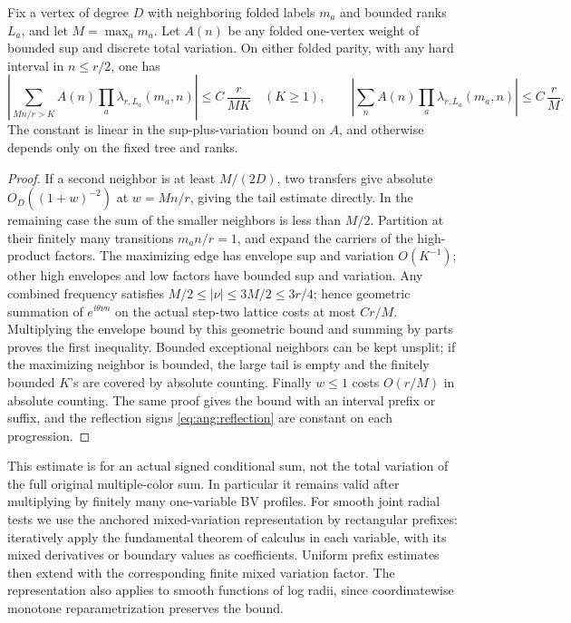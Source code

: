 \begin{lemma}\label{lem:ang:prefix}
Fix a vertex of degree \(D\) with neighboring folded labels \(m_a\) and bounded ranks \(L_a\), and let \(M=\max_a m_a\). Let \(A(n)\) be any folded one-vertex weight of bounded sup and discrete total variation. On either folded parity, with any hard interval in \(n\leq r/2\), one has
\begin{equation}
 \label{eq:ang:prefix}
 \left|\sum_{Mn/r>K} A(n)\prod_{a}\lambda_{r,L_a}(m_a,n)\right|
          \leq C\,\frac{r}{MK}\quad(K\geq1),\qquad
 \left|\sum_n A(n)\prod_a\lambda_{r,L_a}(m_a,n)\right|
          \leq C\,\frac{r}{M}.
\end{equation}
The constant is linear in the sup-plus-variation bound on \(A\), and otherwise depends only on the fixed tree and ranks.
\end{lemma}

\begin{proof}
If a second neighbor is at least \(M/(2D)\), two transfers give absolute \(O_D((1+w)^{-2})\) at \(w=Mn/r\), giving the tail estimate directly. In the remaining case the sum of the smaller neighbors is less than \(M/2\). Partition at their finitely many transitions \(m_a n/r=1\), and expand the carriers of the high-product factors. The maximizing edge has envelope sup and variation \(O(K^{-1})\); other high envelopes and low factors have bounded sup and variation. Any combined frequency satisfies \(M/2\leq|\nu|\leq3M/2\leq3r/4\); hence geometric summation of \(e^{i\theta\nu n}\) on the actual step-two lattice costs at most \(Cr/M\). Multiplying the envelope bound by this geometric bound and summing by parts proves the first inequality. Bounded exceptional neighbors can be kept unsplit; if the maximizing neighbor is bounded, the large tail is empty and the finitely bounded \(K\)'s are covered by absolute counting. Finally \(w\leq1\) costs \(O(r/M)\) in absolute counting. The same proof gives the bound with an interval prefix or suffix, and the reflection signs \eqref{eq:ang:reflection} are constant on each progression.
\end{proof}

This estimate is for an actual signed conditional sum, not the total variation of the full original multiple-color sum. In particular it remains valid after multiplying by finitely many one-variable BV profiles. For smooth joint radial tests we use the anchored mixed-variation representation by rectangular prefixes: iteratively apply the fundamental theorem of calculus in each variable, with its mixed derivatives or boundary values as coefficients. Uniform prefix estimates then extend with the corresponding finite mixed variation factor. The representation also applies to smooth functions of log radii, since coordinatewise monotone reparametrization preserves the bound.


